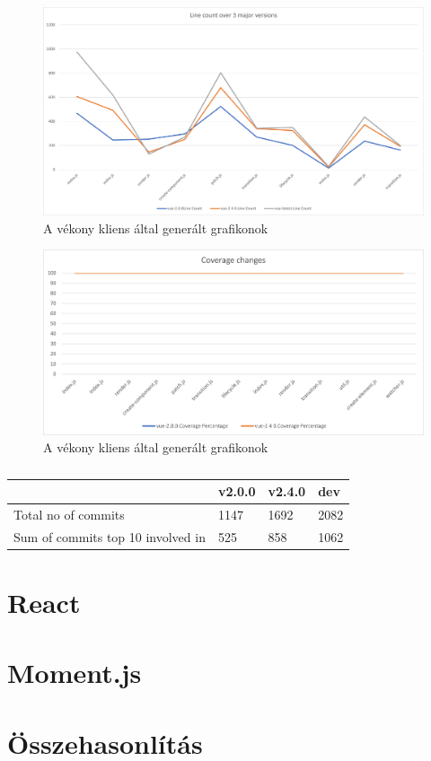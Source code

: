 \begin{figure}[H]
    \centering
    \includegraphics[width=1\textwidth]{images/vue/vue-all-line-count.png}
    \caption{A vékony kliens által generált grafikonok}
    \label{fig:hestia-charts}
\end{figure}

\begin{figure}[H]
    \centering
    \includegraphics[width=1\textwidth]{images/vue/vue-all-coverage.png}
    \caption{A vékony kliens által generált grafikonok}
    \label{fig:hestia-charts}
\end{figure}

\begin{table}[]
    \centering
    \begin{tabular}{l|l|l|l}
                                          & v2.0.0 & v2.4.0 & dev  \\ \hline
        Total no of commits               & 1147   & 1692   & 2082 \\
        Sum of commits top 10 involved in & 525    & 858    & 1062
    \end{tabular}
    \caption{}\label{tab:my-table}
\end{table}

\section{React}

\section{Moment.js}

\section{Összehasonlítás}